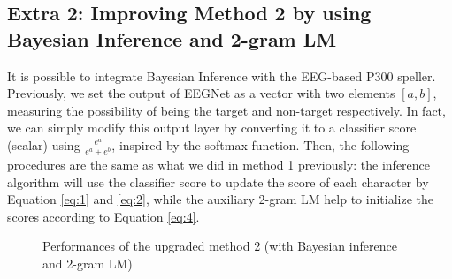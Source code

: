 \documentclass{article}
\begin{document}
\subsection{Extra 2: Improving Method 2 by using Bayesian Inference and 2-gram LM}
It is possible to integrate Bayesian Inference with the EEG-based P300 speller. Previously, we set the output of EEGNet as a vector with two elements $[a, b]$, measuring the possibility of being the target and non-target respectively. In fact, we can simply modify this output layer by converting it to a classifier score (scalar) using $\frac{e^a}{e^a + e^b}$, inspired by the softmax function. Then, the following procedures are the same as what we did in method 1 previously: the inference algorithm will use the classifier score to update the score of each character by Equation \ref{eq:1} and \ref{eq:2}, while the auxiliary 2-gram LM help to initialize the scores according to Equation \ref{eq:4}.

\vspace{-3mm}
\begin{figure}[H]
	\centering
	\qquad
	\hspace{-8mm}
	\caption{Performances of the upgraded method 2 (with Bayesian inference and 2-gram LM)}
	\label{fig:11}
\end{figure}
\end{document}
